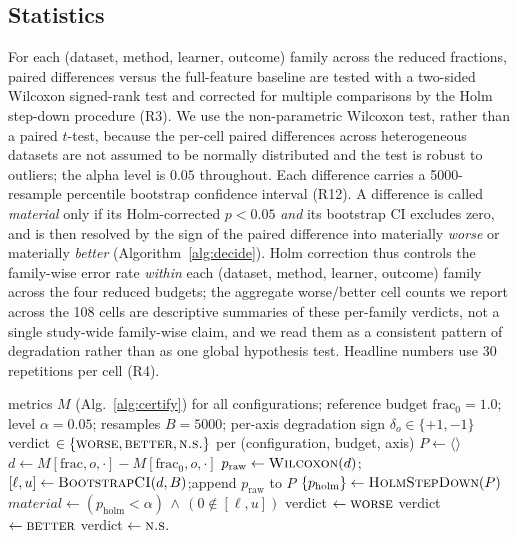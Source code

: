 \documentclass[fleqn,10pt]{wlscirep}
\newcommand{\result}[1]{#1}
\begin{document}
\subsection{Statistics}
For each (dataset, method, learner, outcome) family across the reduced fractions, paired
differences versus the full-feature baseline are tested with a two-sided Wilcoxon signed-rank
test and corrected for multiple comparisons by the Holm step-down procedure
\cite{holm1979simple} (R3). We use the non-parametric Wilcoxon test, rather than a paired $t$-test,
because the per-cell paired differences across heterogeneous datasets are not assumed to be normally
distributed and the test is robust to outliers; the alpha level is $0.05$ throughout. Each
difference carries a 5000-resample percentile bootstrap confidence interval (R12). A difference
is called \emph{material} only if its Holm-corrected $p<0.05$ \emph{and} its bootstrap CI
excludes zero, and is then resolved by the sign of the paired difference into materially
\emph{worse} or materially \emph{better} (Algorithm~\ref{alg:decide}). Holm correction thus controls
the family-wise error rate \emph{within} each (dataset, method, learner, outcome) family across the
four reduced budgets; the aggregate worse/better cell counts we report across the 108 cells are
descriptive summaries of these per-family verdicts, not a single study-wide family-wise claim, and we
read them as a consistent pattern of degradation rather than as one global hypothesis test. Headline
numbers use \result{30} repetitions per cell (R4).

\begin{algorithm}[t]
\caption{\textsc{AggregateAndDecide}: direction-resolved materiality.}
\label{alg:decide}
\begin{algorithmic}[1]
\Require metrics $M$ (Alg.~\ref{alg:certify}) for all configurations; reference budget
  $\mathrm{frac}_0{=}1.0$; level $\alpha{=}0.05$; resamples $B{=}5000$; per-axis degradation sign
  $\delta_o\in\{+1,-1\}$
\Ensure verdict $\in\{\textsc{worse},\textsc{better},\textsc{n.s.}\}$ per (configuration, budget, axis)
  \State $P \gets \langle\rangle$ 
    \State $d \gets M[\mathrm{frac},o,\cdot] - M[\mathrm{frac}_0,o,\cdot]$
    \State $p_{\mathrm{raw}} \gets \textsc{Wilcoxon}(d)$;\quad
      $[\ell,u]\gets\textsc{BootstrapCI}(d,B)$;\quad append $p_{\mathrm{raw}}$ to $P$
  \EndFor
  \State $\{p_{\mathrm{holm}}\} \gets \textsc{HolmStepDown}(P)$
    \State $\mathit{material} \gets (p_{\mathrm{holm}}<\alpha) \,\wedge\, (0\notin[\ell,u])$
     verdict $\gets \textsc{worse}$
     verdict $\gets \textsc{better}$
    \Else{} verdict $\gets \textsc{n.s.}$
    \EndIf
  \EndFor
\EndFor
\end{algorithmic}
\end{algorithm}
\end{document}

